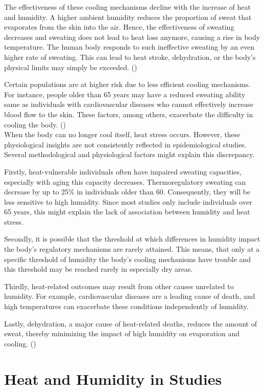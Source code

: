 \documentclass[
]{krantz}
\begin{document}
The effectiveness of these cooling mechanisms decline with the increase of heat and humidity. A higher ambient humidity reduces the proportion of sweat that evaporates from the skin into the air. Hence, the effectiveness of sweating decreases and sweating does not lead to heat loss anymore, causing a rise in body temperature. The human body responds to such ineffective sweating by an even higher rate of sweating. This can lead to heat stroke, dehydration, or the body's physical limits may simply be exceeded. (\citet{bald})

Certain populations are at higher risk due to less efficient cooling mechanisms. For instance, people older than 65 years may have a reduced sweating ability same as individuals with cardiovascular diseases who cannot effectively increase blood flow to the skin. These factors, among others, exacerbate the difficulty in cooling the body. (\citet{ebi})\\
When the body can no longer cool itself, heat stress occurs. However, these physiological insights are not consistently reflected in epidemiological studies. Several methodological and physiological factors might explain this discrepancy.

Firstly, heat-vulnerable individuals often have impaired sweating capacities, especially with aging this capacity decreases. Thermoregulatory sweating can decrease by up to 25\% in individuals older than 60. Consequently, they will be less sensitive to high humidity. Since most studies only include individuals over 65 years, this might explain the lack of association between humidity and heat stress.

Secondly, it is possible that the threshold at which differences in humidity impact the body's regulatory mechanisms are rarely attained. This means, that only at a specific threshold of humidity the body's cooling mechanisms have trouble and this threshold may be reached rarely in especially dry areas.

Thirdly, heat-related outcomes may result from other causes unrelated to humidity. For example, cardiovascular diseases are a leading cause of death, and high temperatures can exacerbate these conditions independently of humidity.

Lastly, dehydration, a major cause of heat-related deaths, reduces the amount of sweat, thereby minimizing the impact of high humidity on evaporation and cooling. (\citet{bald})

\section{Heat and Humidity in Studies}\label{heat-and-humidity-in-studies}
\end{document}
